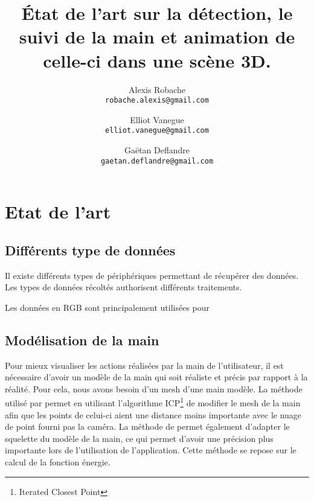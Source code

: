 \documentclass{article}
\title{État de l'art sur la détection, le suivi de la main et animation de celle-ci dans une scène 3D.}
\author{
Alexis Robache \\
\texttt{robache.alexis@gmail.com} \\
\and
Elliot Vanegue\\
\texttt{elliot.vanegue@gmail.com} \\
\and
Gaëtan Deflandre\\
\texttt{gaetan.deflandre@gmail.com} \\
}
\begin{document}
\maketitle
\begin{abstract}
\end{abstract}



\section{Etat de l'art}

\subsection{Différents type de données}
Il existe différents types de périphériques permettant de récupérer des données.
Les types de données récoltés authorisent différents traitements.

Les données en RGB sont principalement utilisées pour 

\subsection{Modélisation de la main}
Pour mieux visualiser les actions réalisées par la main de l'utilisateur, il est nécessaire d'avoir
un modèle de la main qui soit réaliste et précis par rapport à la réalité. Pour cela, nous avons besoin d'un
mesh d'une main modèle. La méthode utilisé par \cite{export:217428} permet en utilisant l'algorithme
ICP\footnote{Iterated Closest Point} \cite{zhang:inria-00074899} de modifier le mesh de la main afin
que les points de celui-ci aient une distance moins importante avec le nuage de point fourni pas la 
caméra. La méthode de \cite{export:217428} permet également d'adapter le squelette du modèle de la 
main, ce qui permet d'avoir une précision plus importante lors de l'utilisation de l'application.
Cette méthode se repose sur le calcul de la fonction énergie.

\end{document}
